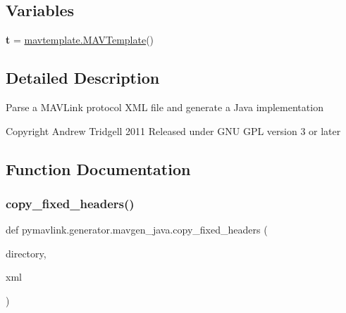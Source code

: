 \subsection*{Variables}
\begin{DoxyCompactItemize}
\item 
\mbox{\label{namespacepymavlink_1_1generator_1_1mavgen__java_a9811e8e58e02d015df7851ec8346e896}} 
{\bfseries t} = \hyperlink{classpymavlink_1_1generator_1_1mavtemplate_1_1MAVTemplate}{mavtemplate.\+M\+A\+V\+Template}()
\end{DoxyCompactItemize}


\subsection{Detailed Description}
\begin{DoxyVerb}    Parse a MAVLink protocol XML file and generate a Java implementation
    
    Copyright Andrew Tridgell 2011
    Released under GNU GPL version 3 or later\end{DoxyVerb}
 

\subsection{Function Documentation}
\mbox{\label{namespacepymavlink_1_1generator_1_1mavgen__java_ab7e11242a8e14499326d0ab7de04d9d1}} 
\subsubsection{\texorpdfstring{copy\+\_\+fixed\+\_\+headers()}{copy\_fixed\_headers()}}
{\footnotesize\ttfamily def pymavlink.\+generator.\+mavgen\+\_\+java.\+copy\+\_\+fixed\+\_\+headers (\begin{DoxyParamCaption}\item[{}]{directory,  }\item[{}]{xml }\end{DoxyParamCaption})}

